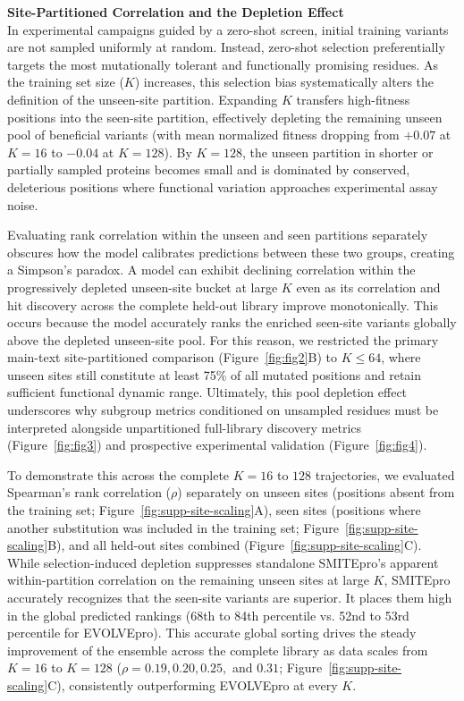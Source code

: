 \documentclass[sn-nature]{sn-jnl}
\begin{document}
\begin{appendices}
\vspace{1em}
\textbf{Site-Partitioned Correlation and the Depletion Effect} \\
In experimental campaigns guided by a zero-shot screen, initial training variants are not sampled uniformly at random. Instead, zero-shot selection preferentially targets the most mutationally tolerant and functionally promising residues. As the training set size ($K$) increases, this selection bias systematically alters the definition of the unseen-site partition. Expanding $K$ transfers high-fitness positions into the seen-site partition, effectively depleting the remaining unseen pool of beneficial variants (with mean normalized fitness dropping from $+0.07$ at $K=16$ to $-0.04$ at $K=128$). By $K = 128$, the unseen partition in shorter or partially sampled proteins becomes small and is dominated by conserved, deleterious positions where functional variation approaches experimental assay noise.

Evaluating rank correlation within the unseen and seen partitions separately obscures how the model calibrates predictions between these two groups, creating a Simpson's paradox. A model can exhibit declining correlation within the progressively depleted unseen-site bucket at large $K$ even as its correlation and hit discovery across the complete held-out library improve monotonically. This occurs because the model accurately ranks the enriched seen-site variants globally above the depleted unseen-site pool. For this reason, we restricted the primary main-text site-partitioned comparison (Figure~\ref{fig:fig2}B) to $K \le 64$, where unseen sites still constitute at least 75\% of all mutated positions and retain sufficient functional dynamic range. Ultimately, this pool depletion effect underscores why subgroup metrics conditioned on unsampled residues must be interpreted alongside unpartitioned full-library discovery metrics (Figure~\ref{fig:fig3}) and prospective experimental validation (Figure~\ref{fig:fig4}).

To demonstrate this across the complete $K = 16$ to $128$ trajectories, we evaluated Spearman's rank correlation ($\rho$) separately on unseen sites (positions absent from the training set; Figure~\ref{fig:supp-site-scaling}A), seen sites (positions where another substitution was included in the training set; Figure~\ref{fig:supp-site-scaling}B), and all held-out sites combined (Figure~\ref{fig:supp-site-scaling}C). While selection-induced depletion suppresses standalone SMITEpro's apparent within-partition correlation on the remaining unseen sites at large $K$, SMITEpro accurately recognizes that the seen-site variants are superior. It places them high in the global predicted rankings (68th to 84th percentile vs. 52nd to 53rd percentile for EVOLVEpro). This accurate global sorting drives the steady improvement of the ensemble across the complete library as data scales from $K = 16$ to $K = 128$ ($\rho = 0.19, 0.20, 0.25,$ and $0.31$; Figure~\ref{fig:supp-site-scaling}C), consistently outperforming EVOLVEpro at every $K$.


\end{appendices}
\end{document}
